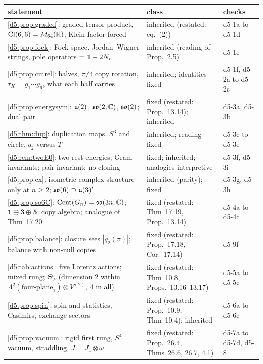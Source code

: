 \begin{table}[t]
\centering
\footnotesize
\begin{tabular}{@{}>{\raggedright\arraybackslash}p{8.1cm}>{\raggedright\arraybackslash}p{5.0cm}>{\raggedright\arraybackslash}p{2.0cm}@{}}
\toprule
statement & class & checks\\
\midrule
\cref{d5:prop:graded}: graded tensor product, $\mathrm{Cl}(6,6)=M_{64}(\mathbb{R})$, Klein factor forced & inherited (restated: eq.~(2)) & d5-1a to d5-1d\\
\cref{d5:prop:fock}: Fock space, Jordan--Wigner strings, pole operators $=\mathbf 1-2N_i$ & inherited (reading of Prop.~2.5) & d5-1e\\
\cref{d5:prop:cmrel}: halves, $\pi/4$ copy rotation, $\tau_K=g_1\cdots g_6$, what each half carries & inherited; identities fixed & d5-1f, d5-2a to d5-2c\\
\cref{d5:prop:energysym}: $\mathfrak{u}(2)$, $\mathfrak{so}(2,\mathbb{C})$, $\mathfrak{so}(2)$; dual pair & fixed (restated: Prop.~13.14); inherited & d5-3a, d5-3b\\
\cref{d5:thm:dup}: duplication maps, $S^3$ and circle, $q_2$ versus $T$ & inherited; reading fixed & d5-3c to d5-3e\\
\cref{d5:rem:twoE0}: two rest energies; Gram invariants; pair invariant; no cloning & fixed; inherited; analogies interpretive & d5-3f, d5-3i\\
\cref{d5:prop:cx}: isometric complex structure only at $n\ge2$; $\mathfrak{so}(6)\supset\mathfrak{u}(3)'$ & inherited (parity); fixed & d5-3g, d5-3h\\
\cref{d5:prop:so6C}: $\operatorname{Cent}(G_n)=\mathfrak{so}(3n,\mathbb{C})$; $\mathbf1\oplus\mathbf3\oplus\mathbf5$; copy algebra; analogue of Thm~17.20 & fixed (restated: Thm~17.19, Prop.~13.14) & d5-4a to d5-4c\\
\cref{d5:prop:balance}: closure sees $|q_2(\pi)|$; balance with non-null copies & fixed (restated: Prop.~17.18, Cor.~17.14) & d5-9f\\
\cref{d5:tab:actions}: five Lorentz actions; mixed rung; $\Theta_F$ (dimension $2$ within $\Lambda^2(\text{four-plane}_1)\otimes V^{(2)}$, $4$ in all) & fixed (restated: Thm~10.8, Props.~13.16--13.17) & d5-5a to d5-5c\\
\cref{d5:prop:spin}: spin and statistics, Casimirs, exchange sectors & fixed (restated: Prop.~10.9, Thm~10.4); inherited & d5-6a to d5-6c\\
\cref{d5:prop:vacuum}: rigid first rung, $S^4$ vacuum, straddling, $J=J_1\otimes\omega$ & fixed (restated: Prop.~26.4, Thms~26.6, 26.7, 4.1) & d5-7a to d5-7d, d5-8\\

\end{tabular}
\end{table}
